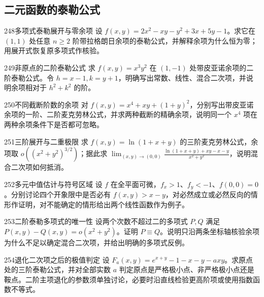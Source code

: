 \subsection{二元函数的泰勒公式}
\begin{exercise}{248}{多项式泰勒展开与零余项}
设 $f(x,y)=2x^2-xy-y^2+3x+5y-1$。求它在 $(1,1)$ 处任意 $n\ge2$ 阶带拉格朗日余项的泰勒公式，并解释余项为什么恒为零；用展开式恢复原多项式作核验。
\end{exercise}
\begin{exercise}{249}{非原点的二阶泰勒公式}
求 $f(x,y)=x^3y^2$ 在 $(1,-1)$ 处带皮亚诺余项的二阶泰勒公式。令 $h=x-1,k=y+1$，明确写出常数、线性、混合二次项，并说明余项相对于 $h^2+k^2$ 的阶。
\end{exercise}
\begin{exercise}{250}{不同截断阶数的余项}
对 $f(x,y)=x^4+xy+(1+y)^2$，分别写出带皮亚诺余项的一阶、二阶麦克劳林公式，并求两种截断的精确余项，说明同一个 $x^4$ 项在两种余项条件下是否都可忽略。
\end{exercise}
\begin{exercise}{251}{三阶展开与二重极限}
求 $f(x,y)=\ln(1+x+y)$ 的三阶麦克劳林公式，余项取 $o((x^2+y^2)^{3/2})$；据此求 $\lim_{(x,y)\to(0,0)}\frac{\ln(1+x+y)+xy-x-y}{x^2+y^2}$，说明混合二次项如何抵消。
\end{exercise}
\begin{exercise}{252}{多元中值估计与符号区域}
设 $f$ 在全平面可微，$f_x>1$、$f_y<-1$、$f(0,0)=0$。分别讨论四个开象限中是否必有 $f(x,y)>x-y$，对必然成立或必然反向的情形作证明，对不能确定的情形给出两个线性函数作为例子。
\end{exercise}
\begin{exercise}{253}{二阶泰勒多项式的唯一性}
设两个次数不超过二的多项式 $P,Q$ 满足 $P(x,y)-Q(x,y)=o(x^2+y^2)$。证明 $P\equiv Q$。说明只沿两条坐标轴核验余项为什么不足以确定混合二次项，并给出明确的多项式反例。
\end{exercise}
\begin{exercise}{254}{退化二次项之后的极值判定}
设 $F_a(x,y)=e^{x+y}-1-x-y-a xy$。求原点处的三阶泰勒公式，并对全部实数 $a$ 判定原点是严格极小点、非严格极小点还是鞍点。二阶主项退化的参数须单独讨论，必要时沿直线检验更高阶项或使用指数函数不等式。
\end{exercise}

